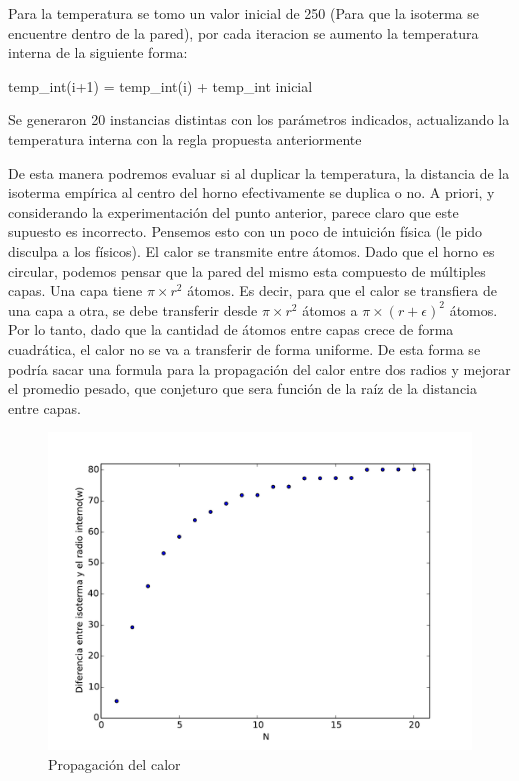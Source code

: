 Para la temperatura se tomo un valor inicial de 250 (Para que la isoterma se encuentre dentro de la pared), por cada
iteracion se aumento la temperatura interna de la siguiente forma:

temp\_int(i+1) = temp\_int(i) + temp\_int inicial

Se generaron 20 instancias distintas con los parámetros indicados, actualizando la temperatura interna con la regla
propuesta anteriormente

De esta manera podremos evaluar si al duplicar la temperatura, la distancia de la isoterma empírica al centro del horno efectivamente se duplica o no. A priori, y considerando la experimentación del punto anterior, parece claro que este supuesto es incorrecto. Pensemos esto con un poco de intuición física (le pido disculpa a los físicos). El calor se transmite entre átomos. Dado que el horno es circular, podemos pensar que la pared del mismo esta compuesto de múltiples capas. Una capa tiene $\pi \times r^2$ átomos. Es decir, para que el calor se transfiera de una capa a otra, se debe transferir desde $\pi \times r^2$ átomos a $\pi \times (r+\epsilon)^2$ átomos. Por lo tanto, dado que la cantidad de átomos entre capas crece de forma cuadrática, el calor no se va a transferir de forma uniforme. De esta forma se podría sacar una formula para la propagación del calor entre dos radios y mejorar el promedio pesado, que conjeturo que sera función de la raíz de la distancia entre capas.

\begin{figure}[h]
\centering
\includegraphics[scale=0.6]{graficos/tempProp_w.pdf}
\caption{Propagación del calor}
\label{timeDim}
\end{figure}

